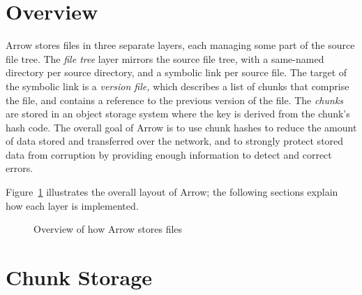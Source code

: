 \documentclass{article}
\begin{document}
\section{Overview}

Arrow stores files in three separate layers, each managing some part
of the source file tree. The \emph{file tree} layer mirrors the source
file tree, with a same-named directory per source directory, and a
symbolic link per source file. The target of the symbolic link is a
\emph{version file,} which describes a list of chunks that comprise
the file, and contains a reference to the previous version of the
file. The \emph{chunks} are stored in an object storage system where
the key is derived from the chunk's hash code. The overall goal of
Arrow is to use chunk hashes to reduce the amount of data stored and
transferred over the network, and to strongly protect stored data from
corruption by providing enough information to detect and correct
errors.

Figure~\ref{figure:arrow-layout} illustrates the overall layout of
Arrow; the following sections explain how each layer is implemented.

\begin{figure}[ht!]
  \begin{center}
    \caption{Overview of how Arrow stores files}
    \label{figure:arrow-layout}
  \end{center}
\end{figure}

\section{Chunk Storage}
\end{document}
